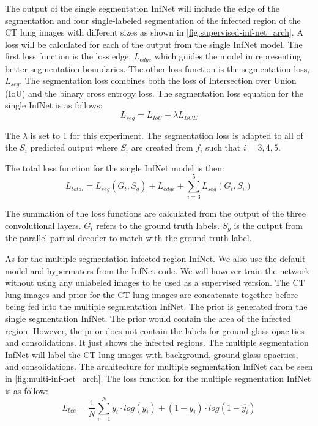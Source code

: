The output of the single segmentation InfNet will include the edge of the segmentation and four single-labeled segmentation of the infected region of the CT lung images with different sizes as shown in \ref{fig:supervised-inf-net_arch}. A loss will be calculated for each of the output from the single InfNet model. The first loss function is the loss edge, $L_{edge}$ which guides the model in representing better segmentation boundaries. The other loss function is the segmentation loss, ${L_{seg}}$. The segmentation loss combines both the loss of Intersection over Union (IoU) and the binary cross entropy loss. The segmentation loss equation for the single InfNet is as follows:
\begin{equation}
L_{seg} = L_{IoU} + \lambda L_{BCE}
\end{equation}

The $\lambda$ is set to 1 for this experiment. The segmentation loss is adapted to all of the ${S_i}$ predicted output where ${S_i}$ are created from $f_i$ such that $i={3,4,5}$. 

The total loss function for the single InfNet model is then:
\begin{equation}
L_{total} = L_{seg}(G_t, S_g) + L_{edge} + 	\sum_{i=3}^{5}L_{seg}(G_t, S_i)
\end{equation}

The summation of the loss functions are calculated from the output of the three convolutional layers. $G_t$ refers to the ground truth labels. $S_g$ is the output from the parallel partial decoder to match with the ground truth label.

As for the multiple segmentation infected region InfNet. We also use the default model and hypermaters from the InfNet code. We will however train the network without using any unlabeled images to be used as a supervised version. The CT lung images and prior for the CT lung images are concatenate together before being fed into the multiple segmentation InfNet. The prior is generated from the single segmentation InfNet. The prior would contain the area of the infected region. However, the prior does not contain the labels for ground-glass opacities and consolidations. It just shows the infected regions. The multiple segmentation InfNet will label the CT lung images with background, ground-glass opacities, and consolidations. The architecture for multiple segmentation InfNet can be seen in \ref{fig:multi-inf-net_arch}. The loss function for the multiple segmentation InfNet is as follow:
\begin{equation}
L_{bce} = \frac{1}{N}\sum_{i=1}^{N} y_i \cdot log(\hat{y_i}) + (1-y_i)\cdot log(1-\hat{y_i})
\end{equation}

